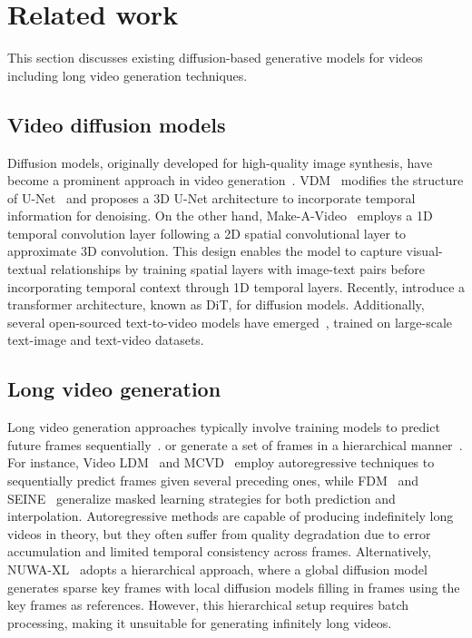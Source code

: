 
\section{Related work}
\label{sec:related_work}
This section discusses existing diffusion-based generative models for videos including long video generation techniques.

\subsection{Video diffusion models}
\label{subsec:vdm}
Diffusion models, originally developed for high-quality image synthesis, have become a prominent approach in video generation~\citep{chen2023videocrafter1,ho2022video,singer2022make,zhou2022magic,wang2023modelscope}.
VDM~\citep{ho2022video} modifies the structure of U-Net~\citep{ronneberger2015unet} and proposes a 3D U-Net architecture to incorporate temporal information for denoising. 
On the other hand, Make-A-Video~\citep{singer2022make} employs a 1D temporal convolution layer following a 2D spatial convolutional layer to approximate 3D convolution.
This design enables the model to capture visual-textual relationships by training spatial layers with image-text pairs before incorporating temporal context through 1D temporal layers. 
Recently, \citep{peebles2023dit} introduce a transformer architecture,  known as DiT, for diffusion models.
Additionally, several open-sourced text-to-video models have emerged~\citep{wang2023modelscope,chen2023videocrafter1,wang2023lavie,chen2024videocrafter2}, trained on large-scale text-image and text-video datasets.


\subsection{Long video generation}
\label{subsec:long_vdm}

Long video generation approaches typically involve training models to predict future frames sequentially~\citep{voleti2022mcvd,harvey2022flexible,blattmann2023align, chen2023seine}. or generate a set of frames in a hierarchical manner~\citep{he2022latent,yin2023nuwa}.
For instance, Video LDM~\citep{blattmann2023align} and MCVD~\citep{voleti2022mcvd} employ autoregressive techniques to sequentially predict frames given several preceding ones, while FDM~\citep{harvey2022flexible} and SEINE~\citep{chen2023seine} generalize masked learning strategies for both prediction and interpolation.
Autoregressive methods are capable of producing indefinitely long videos in theory, but they often suffer from quality degradation due to error accumulation and limited temporal consistency across frames.
Alternatively, NUWA-XL~\citep{yin2023nuwa} adopts a hierarchical approach, where a global diffusion model generates sparse key frames with local diffusion models filling in frames using the key frames as references. 
However, this hierarchical setup requires batch processing, making it unsuitable for generating infinitely long videos. 

